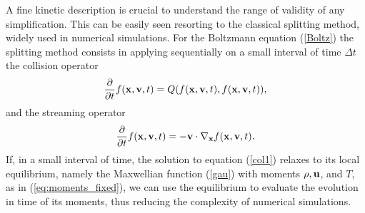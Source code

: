 \documentclass{article}
\newcommand{\bv}{\mathrm{BV}}
\newcommand{\fer}[1]{(\ref{#1})}
\def\bx{{\bf x}}
\def\bu{{\bf u}}
\def\bv{{\bf v}}
\begin{document}
% 
A fine kinetic description is crucial to understand the range of validity of any simplification.
% 
This can be easily seen resorting to the classical splitting method, widely used in numerical simulations.\cite{Blanes} For the Boltzmann equation \fer{Boltz} the splitting method consists in applying sequentially on a small interval of time $\Delta t$ the collision operator
\begin{equation}
    \label{col1}
    \frac\partial{\partial t}f(\bx,\bv,t) = Q(f(\bx,\bv,t),f(\bx,\bv,t)),
\end{equation}
and the streaming operator
\begin{equation}
    \label{stre}
    \frac\partial{\partial t}f(\bx,\bv,t) = -\bv\cdot\nabla_\bx f(\bx,\bv,t).
\end{equation}
If, in a small interval of time, the solution to equation \fer{col1} relaxes to its local equilibrium, namely the Maxwellian function \fer{gau} with moments $\rho, \bu$, and $T$, as in \fer{eq:moments_fixed}, we can use the equilibrium to evaluate the evolution in time of its moments, thus reducing the complexity of numerical simulations.
% 
\end{document}
